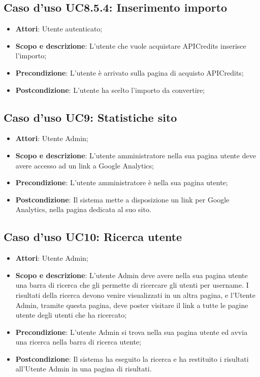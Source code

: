 \documentclass[12pt,a4paper,titlepage]{article}
\begin{document}
	\subsection{Caso d'uso UC8.5.4: Inserimento importo}
	\label{UC8.5.4}
	\begin{itemize}
		\item \textbf{Attori}: Utente autenticato;
		\item \textbf{Scopo e descrizione}: L'utente che vuole acquistare APICredits inserisce l'importo;
		\item \textbf{Precondizione}: L'utente è arrivato sulla pagina di acquisto APICredits;
		\item \textbf{Postcondizione}: L'utente ha scelto l'importo da convertire;
	\end{itemize}
	\subsection{Caso d'uso UC9: Statistiche sito}
	\label{UC9}
	\begin{itemize}
		\item \textbf{Attori}: Utente Admin;
		\item \textbf{Scopo e descrizione}: L'utente amministratore nella sua pagina utente deve avere accesso ad un link a Google Analytics;
		\item \textbf{Precondizione}: L'utente amministratore è nella sua pagina utente;
		\item \textbf{Postcondizione}: Il sistema mette a disposizione un link per Google Analytics, nella pagina dedicata al suo sito.
	\end{itemize}
	\subsection{Caso d'uso UC10: Ricerca utente}
	\label{UC10}
	\begin{itemize}
		\item \textbf{Attori}: Utente Admin;
		\item \textbf{Scopo e descrizione}: L'utente Admin deve avere nella sua pagina utente una barra di ricerca che gli permette di ricercare gli utenti per username. I risultati della ricerca devono venire visualizzati in un altra pagina, e l'Utente Admin, tramite questa pagina, deve poster visitare il link a tutte le pagine utente degli utenti che ha ricercato;
		\item \textbf{Precondizione}: L'utente Admin si trova nella sua pagina utente ed avvia una ricerca nella barra di ricerca utente;
		\item \textbf{Postcondizione}: Il sistema ha eseguito la ricerca e ha restituito i risultati all'Utente Admin in una pagina di risultati.
	\end{itemize}
\end{document}
